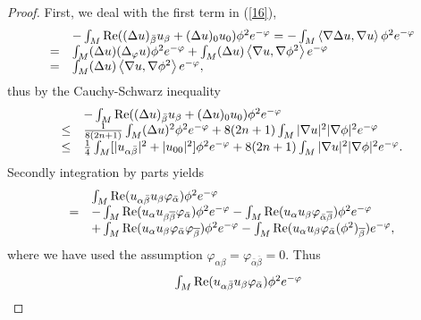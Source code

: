 \documentclass[10pt,a4paper]{amsart}
\begin{document}
\begin{proof}
First, we deal with the first term in (\ref{16}),
\[%
\begin{array}
[c]{ll}
& -\int_{M}\mathrm{\operatorname{Re}}((\Delta u)_{\bar{\beta}}u_{\beta
}+(\Delta u)_{0}u_{0})\phi^{2}e^{-\varphi}=-\int_{M}\left\langle \nabla\Delta
u,\nabla u\right\rangle \phi^{2}e^{-\varphi}\\
= & \int_{M}(\Delta u)(\Delta_{\varphi}u)\phi^{2}e^{-\varphi}+\int_{M}(\Delta
u)\left\langle \nabla u,\nabla\phi^{2}\right\rangle e^{-\varphi}\\
= & \int_{M}(\Delta u)\left\langle \nabla u,\nabla\phi^{2}\right\rangle
e^{-\varphi},
\end{array}
\]
thus by the Cauchy-Schwarz inequality
\begin{equation}%
\begin{array}
[c]{ll}
& -\int_{M}\mathrm{\operatorname{Re}}((\Delta u)_{\bar{\beta}}u_{\beta
}+(\Delta u)_{0}u_{0})\phi^{2}e^{-\varphi}\\
\leq & \frac{1}{8(2n+1)}\int_{M}(\Delta u)^{2}\phi^{2}e^{-\varphi}%
+8(2n+1)\int_{M}|\nabla u|^{2}|\nabla\phi|^{2}e^{-\varphi}\\
\leq & \frac{1}{4}\int_{M}[|u_{\alpha\bar{\beta}}|^{2}+|u_{00}|^{2}]\phi
^{2}e^{-\varphi}+8(2n+1)\int_{M}|\nabla u|^{2}|\nabla\phi|^{2}e^{-\varphi}.
\end{array}
\label{17}%
\end{equation}
Secondly integration by parts yields
\[%
\begin{array}
[c]{ll}
& \int_{M}\operatorname{Re}(u_{\alpha\bar{\beta}}u_{\beta}\varphi_{\bar
{\alpha}})\phi^{2}e^{-\varphi}\\
= & -\int_{M}\operatorname{Re}(u_{\alpha}u_{\beta\overline{\beta}}%
\varphi_{\bar{\alpha}})\phi^{2}e^{-\varphi}-\int_{M}\operatorname{Re}%
(u_{\alpha}u_{\beta}\varphi_{\bar{\alpha}\overline{\beta}})\phi^{2}%
e^{-\varphi}\\
& +\int_{M}\operatorname{Re}(u_{\alpha}u_{\beta}\varphi_{\bar{\alpha}}%
\varphi_{\overline{\beta}})\phi^{2}e^{-\varphi}-\int_{M}\operatorname{Re}%
(u_{\alpha}u_{\beta}\varphi_{\bar{\alpha}}(\phi^{2})_{\overline{\beta}%
})e^{-\varphi},
\end{array}
\]
where we have used the assumption $\varphi_{\alpha\beta}=\varphi_{\bar{\alpha
}\overline{\beta}}=0.$ Thus%
\begin{equation}%
\begin{array}
[c]{ll}
& \int_{M}\operatorname{Re}(u_{\alpha\bar{\beta}}u_{\beta}\varphi_{\bar
{\alpha}})\phi^{2}e^{-\varphi}\\

\end{array}
\end{equation}
\end{proof}
\end{document}
